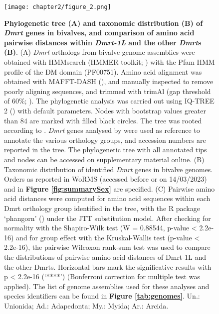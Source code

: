\documentclass[../main.tex]{subfiles}
\begin{document}
\begin{figure}
    \centering
    \texttt{[image: chapter2/figure\_2.png]}
    \captionsetup{width=\textwidth}
    \caption{
    \textbf{Phylogenetic tree (A) and taxonomic distribution (B) of \textit{Dmrt} genes in bivalves, and comparison of amino acid pairwise distances within \textit{Dmrt-1L} and the other \textit{Dmrt}s (B)}. (A) \textit{Dmrt} orthologs from bivalve genome assemblies were obtained with HMMsearch (HMMER toolkit; \textbf{\cite{eddy2011accelerated}}) with the Pfam HMM profile of the DM domain (PF00751). Amino acid alignment was obtained with MAFFT-DASH (\textbf{\cite{rozewicki2019mafft}}), and manually inspected to remove poorly aligning sequences, and trimmed with trimAl (gap threshold of 60\%; \textbf{\cite{capella2009trimal}}). The phylogenetic analysis was carried out using IQ-TREE 2 (\textbf{\cite{minh2020iq}}) with default parameters. Nodes with bootstrap values greater than 84 are marked with filled black circles. The tree was rooted according to \textbf{\cite{evensen2022comparative}}. \textit{Dmrt} genes analysed by \textbf{\cite{evensen2022comparative}} were used as reference to annotate the various orthology groups, and accession numbers are reported in the tree. The phylogenetic tree with all annotated tips and nodes can be accessed on supplementary material online. (B) Taxonomic distribution of identified \textit{Dmrt} genes in bivalve genomes. Orders as reported in WoRMS (accessed before or on 14/03/2023) and in \textbf{Figure \ref{fig:summarySex}} are specified. (C) Pairwise amino acid distances were computed for amino acid sequences within each Dmrt orthology group identified in the tree, with the R package ‘phangorn’ (\textbf{\cite{schliep2011phangorn}}) under the JTT substitution model. After checking for normality with the Shapiro-Wilk test (W = 0.88544, p-value < 2.2e-16) and for group effect with the Kruskal-Wallis test (p-value < 2.2e-16), the pairwise Wilcoxon rank-sum test was used to compare the distributions of pairwise amino acid distances of Dmrt-1L and the other Dmrts. Horizontal bars mark the significative results with p < 2.2e-16 (‘****’) (Bonferroni correction for multiple test was applied). The list of genome assemblies used for these analyses and species identifiers can be found in \textbf{Figure \ref{tab:genomes}}. Un.: Unionida; Ad.: Adapedonta; My.: Myida; Ar.: Arcida.
    }
    
    \label{fig:dmrt}
\end{figure}
\end{document}
